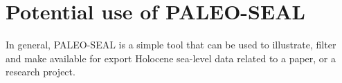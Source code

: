 \documentclass[a4paper,fleqn]{cas-dc}
\begin{document}
\section{Potential use of PALEO-SEAL}
In general, PALEO-SEAL is a simple tool that can be used to illustrate, filter and make available for export Holocene sea-level data related to a paper, or a research project.   

\printcredits

%



\end{document}

